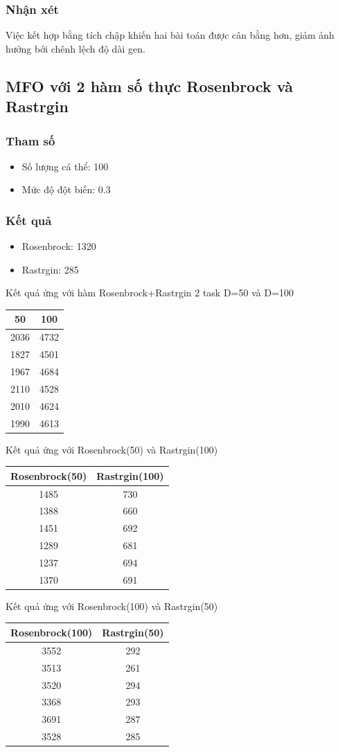 \documentclass[a4paper,12pt]{report}
\begin{document}
\subsubsection{Nhận xét}
Việc kết hợp bằng tích chập khiến hai bài toán  được cân bằng hơn, giảm ảnh hưởng bới chênh lệch độ dài gen.



\subsection{MFO với 2 hàm số thực Rosenbrock và Rastrgin}
\subsubsection{Tham số}
\begin{itemize}
\item Số lượng cá thể: 100
\item Mức độ đột biến: 0.3
\end{itemize}
\subsubsection{Kết quả} 
\begin{itemize}
\item Rosenbrock: 1320  
\item Rastrgin: 285
\end{itemize}

Kết quả ứng với hàm Rosenbrock+Rastrgin 2 task   D=50 và D=100
\begin{longtable}{|c |c |}
\hline
50 &100 \\
\hline
2036 & 4732\\
1827 & 4501\\
1967 & 4684\\
2110 & 4528\\
2010 & 4624\\
\hline
\hline
1990 & 4613\\ 
\hline
\end{longtable}
Kết quả ứng với Rosenbrock(50) và Rastrgin(100) \\
\begin{longtable}{|c |c |}
\hline
Rosenbrock(50) &Rastrgin(100) \\
\hline
1485 & 730\\
1388 & 660\\
1451 & 692\\
1289 & 681\\
1237 & 694\\
\hline
\hline
1370 & 691\\ 
\hline
\end{longtable}
Kết quả ứng với Rosenbrock(100) và Rastrgin(50) \\
\begin{longtable}{|c |c |}
\hline
Rosenbrock(100) &Rastrgin(50) \\
\hline
3552 & 292\\
3513 & 261\\
3520 & 294\\
3368 & 293\\
3691 & 287\\
\hline
\hline
3528 & 285\\ 
\hline
\end{longtable}
\end{document}
